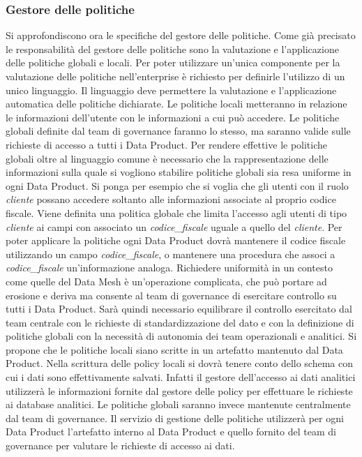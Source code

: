 \documentclass[12pt]{report}
\begin{document}
\subsubsection{Gestore delle politiche}
Si approfondiscono ora le specifiche del gestore delle politiche.
Come già precisato le responsabilità del gestore delle politiche sono la valutazione e l'applicazione delle politiche globali e locali.
Per poter utilizzare un'unica componente per la valutazione delle politiche nell'enterprise è richiesto per definirle l'utilizzo di un unico linguaggio. 
Il linguaggio deve permettere la valutazione e l'applicazione automatica delle politiche dichiarate.
Le politiche locali metteranno in relazione le informazioni dell'utente con le informazioni a cui può accedere.
Le politiche globali definite dal team di governance faranno lo stesso, ma saranno valide sulle richieste di accesso a tutti i Data Product.
Per rendere effettive le politiche globali oltre al linguaggio comune è necessario che la rappresentazione delle informazioni sulla quale si vogliono stabilire politiche globali sia resa uniforme in ogni Data Product.
Si ponga per esempio che si voglia che gli utenti con il ruolo \textit{cliente} possano accedere soltanto alle informazioni associate al proprio codice fiscale.
Viene definita una politica globale che limita l'accesso agli utenti di tipo \textit{cliente} ai campi con associato un \textit{codice\_fiscale} uguale a quello del \textit{cliente}.
Per poter applicare la politiche ogni Data Product dovrà mantenere il codice fiscale utilizzando un campo \textit{codice\_fiscale}, o mantenere una procedura che associ  a \textit{codice\_fiscale} un'informazione analoga.
Richiedere uniformità in un contesto come quelle del Data Mesh è un'operazione complicata, che può portare ad erosione e deriva ma consente al team di governance di esercitare controllo su tutti i Data Product.
Sarà quindi necessario equilibrare il controllo esercitato dal team centrale con le richieste di standardizzazione del dato e con la definizione di politiche globali con la necessità di autonomia dei team operazionali e analitici.
Si propone che le politiche locali siano scritte in un artefatto mantenuto dal Data Product. 
Nella scrittura delle policy locali si dovrà tenere conto dello schema con cui i dati sono effettivamente salvati.
Infatti il gestore dell'accesso ai dati analitici utilizzerà le informazioni fornite dal gestore delle policy per effettuare le richieste ai database analitici.
Le politiche globali saranno invece mantenute centralmente dal team di governance.
Il servizio di gestione delle politiche utilizzerà per ogni Data Product l'artefatto interno al Data Product e quello fornito del team di governance per valutare le richieste di accesso ai dati.
\end{document}

